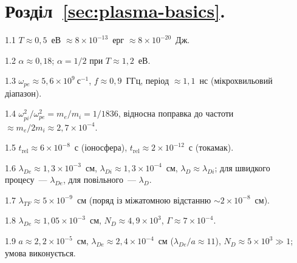 \protect \section *{Розділ~\ref *{sec:plasma-basics}. }
\begin{Solution}{1.{1}}
		$T\approx0{,}5$~еВ $\approx8\times10^{-13}$~ерг $\approx8\times10^{-20}$~Дж.
	
\end{Solution}
\begin{Solution}{1.{2}}
		$\alpha\approx0{,}18$; $\alpha=1/2$ при $T\approx1{,}2$~еВ.
	
\end{Solution}
\begin{Solution}{1.{3}}
		$\omega_{pe}\approx5{,}6\times10^{9}~\mathrm{с}^{-1}$, $f\approx0{,}9$~ГГц, період $\approx1{,}1$~нс (мікрохвильовий діапазон).
	
\end{Solution}
\begin{Solution}{1.{4}}
		$\omega_{pi}^2/\omega_{pe}^2=m_e/m_i=1/1836$, відносна поправка до частоти $\approx m_e/2m_i\approx2{,}7\times10^{-4}$.
	
\end{Solution}
\begin{Solution}{1.{5}}
		$t_\mathrm{rel}\approx6\times10^{-8}$~с (іоносфера), $t_\mathrm{rel}\approx2\times10^{-12}$~с (токамак).
	
\end{Solution}
\begin{Solution}{1.{6}}
		$\lambda_{De}\approx1{,}3\times10^{-3}$~см, $\lambda_{Di}\approx1{,}3\times10^{-4}$~см, $\lambda_D\approx\lambda_{Di}$;
	для швидкого процесу~--- $\lambda_{De}$, для повільного~--- $\lambda_D$.
	
\end{Solution}
\begin{Solution}{1.{7}}
		$\lambda_{TF}\approx5\times10^{-9}$~см (поряд із міжатомною відстанню $\sim2\times10^{-8}$~см).
	
\end{Solution}
\begin{Solution}{1.{8}}
		$\lambda_{De}\approx1{,}05\times10^{-3}$~см, $N_D\approx4{,}9\times10^{3}$, $\Gamma\approx7\times10^{-4}$.
	
\end{Solution}
\begin{Solution}{1.{9}}
		$a\approx2{,}2\times10^{-5}$~см, $\lambda_{De}\approx2{,}4\times10^{-4}$~см ($\lambda_{De}/a\approx11$),
	$N_D\approx5\times10^{3}\gg1$; умова виконується.
	
\end{Solution}
